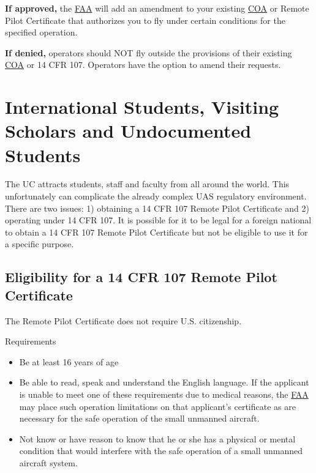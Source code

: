 \documentclass[
]{book}
\providecommand{\tightlist}{%
  \setlength{\itemsep}{0pt}\setlength{\parskip}{0pt}}
\begin{document}
\textbf{If approved,} the \protect\hyperlink{FAA}{FAA} will add an amendment to your existing \protect\hyperlink{COA}{COA} or Remote Pilot Certificate that authorizes you to fly under certain conditions for the specified operation.

\textbf{If denied,} operators should NOT fly outside the provisions of their existing \protect\hyperlink{COA}{COA} or 14 CFR 107. Operators have the option to amend their requests.

\hypertarget{international-students-visiting-scholars-and-undocumented-students}{%
\section{International Students, Visiting Scholars and Undocumented Students}\label{international-students-visiting-scholars-and-undocumented-students}}

The UC attracts students, staff and faculty from all around the world. This unfortunately can complicate the already complex UAS regulatory environment. There are two issues: 1) obtaining a 14 CFR 107 Remote Pilot Certificate and 2) operating under 14 CFR 107. It is possible for it to be legal for a foreign national to obtain a 14 CFR 107 Remote Pilot Certificate but not be eligible to use it for a specific purpose.

\hypertarget{eligibility-for-a-14-cfr-107-remote-pilot-certificate}{%
\subsection{Eligibility for a 14 CFR 107 Remote Pilot Certificate}\label{eligibility-for-a-14-cfr-107-remote-pilot-certificate}}

The Remote Pilot Certificate does not require U.S. citizenship.

Requirements

\begin{itemize}
\tightlist
\item
  Be at least 16 years of age
\item
  Be able to read, speak and understand the English language. If the applicant is unable to meet one of these requirements due to medical reasons, the \protect\hyperlink{FAA}{FAA} may place such operation limitations on that applicant's certificate as are necessary for the safe operation of the small unmanned aircraft.
\item
  Not know or have reason to know that he or she has a physical or mental condition that would interfere with the safe operation of a small unmanned aircraft system.
\end{itemize}
\end{document}

